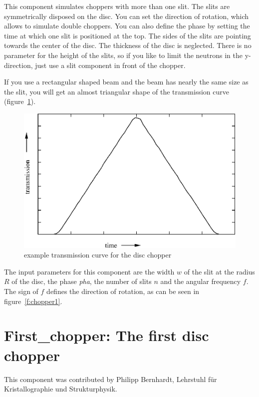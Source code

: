 This component simulates choppers with more than one slit. The slits are
symmetrically disposed on the disc. You can set the direction of
rotation, which allows to simulate double choppers. You can also define
the phase by setting the time at which one slit is positioned at the
top. The sides of the slits are pointing towards the center of the disc.
The thickness of the disc is neglected.  There is no parameter for the
height of the slits, so if you like to limit the neutrons in the
y-direction, just use a slit component in front of the chopper.

If you use a rectangular shaped beam and the beam has nearly the same
size as the slit, you will get an almost triangular shape of the
transmission curve (figure~\ref{f:chopper2}).

\begin{figure}[ht]
\includegraphics[width=1.0\linewidth]{figures/tracho.eps}
\caption{example transmission curve for the disc chopper\label{f:chopper2}}
\end{figure}    

The input parameters for this component are the width $w$ of the slit at
the radius $R$ of the disc, the phase \textit{pha}, the number of slits $n$ and the
angular frequency $f$. The sign of $f$ defines the direction of rotation, as
can be seen in figure~\ref{f:chopper1}.


\section{First\_chopper: The first disc chopper}
\label{s:first_chopper}

This component was contributed by Philipp Bernhardt, Lehrstuhl f\"ur
Kristallographie und Strukturphysik.

